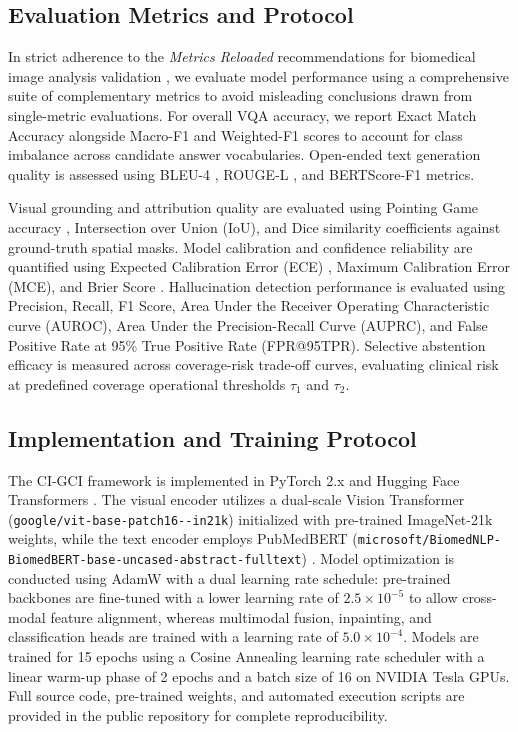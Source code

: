\documentclass[journal,twoside,web]{ieeecolor}
\begin{document}
\subsection{Evaluation Metrics and Protocol}
In strict adherence to the \emph{Metrics Reloaded} recommendations for biomedical image analysis validation \cite{maier2024}, we evaluate model performance using a comprehensive suite of complementary metrics to avoid misleading conclusions drawn from single-metric evaluations. For overall VQA accuracy, we report Exact Match Accuracy alongside Macro-F1 and Weighted-F1 scores to account for class imbalance across candidate answer vocabularies. Open-ended text generation quality is assessed using BLEU-4 \cite{papineni2002bleu}, ROUGE-L \cite{lin2004rouge}, and BERTScore-F1 \cite{zhang2019bertscore} metrics.

Visual grounding and attribution quality are evaluated using Pointing Game accuracy \cite{zhang2018pointing}, Intersection over Union (IoU), and Dice similarity coefficients \cite{dice1945} against ground-truth spatial masks. Model calibration and confidence reliability are quantified using Expected Calibration Error (ECE) \cite{guo2017}, Maximum Calibration Error (MCE), and Brier Score \cite{brier1950}. Hallucination detection performance is evaluated using Precision, Recall, F1 Score, Area Under the Receiver Operating Characteristic curve (AUROC), Area Under the Precision-Recall Curve (AUPRC), and False Positive Rate at 95\% True Positive Rate (FPR@95TPR). Selective abstention efficacy is measured across coverage-risk trade-off curves, evaluating clinical risk at predefined coverage operational thresholds $\tau_1$ and $\tau_2$.

\subsection{Implementation and Training Protocol}
The CI-GCI framework is implemented in PyTorch 2.x \cite{paszke2019pytorch} and Hugging Face Transformers \cite{wolf2020transformers}. The visual encoder utilizes a dual-scale Vision Transformer (\texttt{google/\allowbreak vit-base-\allowbreak patch16--\allowbreak in21k}) \cite{dosovitskiy2020vit} initialized with pre-trained ImageNet-21k weights, while the text encoder employs PubMedBERT (\texttt{microsoft/\allowbreak BiomedNLP-\allowbreak BiomedBERT-\allowbreak base-\allowbreak uncased-\allowbreak abstract-\allowbreak fulltext}) \cite{gu2021}. Model optimization is conducted using AdamW \cite{loshchilov2018adamw} with a dual learning rate schedule: pre-trained backbones are fine-tuned with a lower learning rate of $2.5 \times 10^{-5}$ to allow cross-modal feature alignment, whereas multimodal fusion, inpainting, and classification heads are trained with a learning rate of $5.0 \times 10^{-4}$. Models are trained for 15 epochs using a Cosine Annealing learning rate scheduler with a linear warm-up phase of 2 epochs and a batch size of 16 on NVIDIA Tesla GPUs. Full source code, pre-trained weights, and automated execution scripts are provided in the public repository for complete reproducibility.
\end{document}
